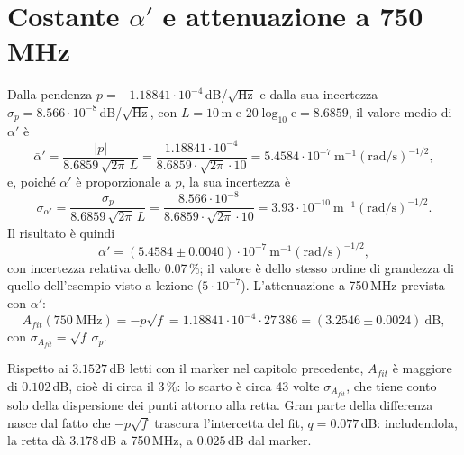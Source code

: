 \documentclass[11pt,a4paper,oneside]{book}
\begin{document}
\section{Costante \texorpdfstring{$\alpha'$}{alpha'} e attenuazione a \texorpdfstring{750\,MHz}{750 MHz}}
Dalla pendenza $p = -1.18841\cdot10^{-4}$\,dB/$\sqrt{\mathrm{Hz}}$ e dalla sua incertezza $\sigma_p = 8.566\cdot10^{-8}$\,dB/$\sqrt{\mathrm{Hz}}$, con $L = 10$\,m e $20\log_{10}\mathrm{e} = 8.6859$, il valore medio di $\alpha'$ è
\begin{equation}
\bar\alpha' = \frac{|p|}{8.6859\,\sqrt{2\pi}\,L} = \frac{1.18841\cdot10^{-4}}{8.6859\cdot\sqrt{2\pi}\cdot10} = 5.4584\cdot10^{-7}\ \mathrm{m}^{-1}(\mathrm{rad/s})^{-1/2},
\end{equation}
e, poiché $\alpha'$ è proporzionale a $p$, la sua incertezza è
\begin{equation}
\sigma_{\alpha'} = \frac{\sigma_p}{8.6859\,\sqrt{2\pi}\,L} = \frac{8.566\cdot10^{-8}}{8.6859\cdot\sqrt{2\pi}\cdot10} = 3.93\cdot10^{-10}\ \mathrm{m}^{-1}(\mathrm{rad/s})^{-1/2}.
\end{equation}
Il risultato è quindi
\begin{equation}
\alpha' = (5.4584\pm0.0040)\cdot10^{-7}\ \mathrm{m}^{-1}(\mathrm{rad/s})^{-1/2},
\end{equation}
con incertezza relativa dello 0.07\,\%; il valore è dello stesso ordine di grandezza di quello dell'esempio visto a lezione ($5\cdot10^{-7}$). L'attenuazione a 750\,MHz prevista con $\alpha'$:
\begin{equation}
A_{fit}(750\ \mathrm{MHz}) = -p\sqrt f = 1.18841\cdot10^{-4}\cdot27\,386 = (3.2546\pm0.0024)\ \mathrm{dB},
\end{equation}
con $\sigma_{A_{fit}} = \sqrt f\,\sigma_p$.

Rispetto ai $3.1527$\,dB letti con il marker nel capitolo precedente, $A_{fit}$ è maggiore di $0.102$\,dB, cioè di circa il 3\,\%: lo scarto è circa 43 volte $\sigma_{A_{fit}}$, che tiene conto solo della dispersione dei punti attorno alla retta. Gran parte della differenza nasce dal fatto che $-p\sqrt f$ trascura l'intercetta del fit, $q = 0.077$\,dB: includendola, la retta dà $3.178$\,dB a 750\,MHz, a $0.025$\,dB dal marker.
\end{document}

